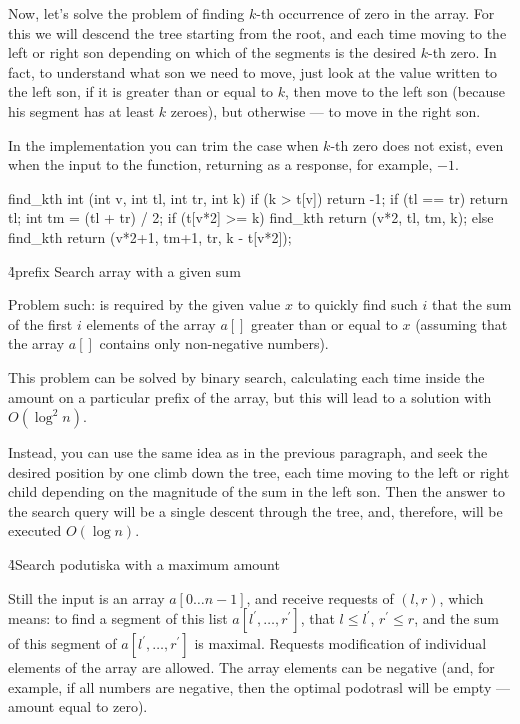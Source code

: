 Now, let's solve the problem of finding $k$-th occurrence of zero in the array. For this we will descend the tree starting from the root, and each time moving to the left or right son depending on which of the segments is the desired $k$-th zero. In fact, to understand what son we need to move, just look at the value written to the left son, if it is greater than or equal to $k$, then move to the left son (because his segment has at least $k$ zeroes), but otherwise --- to move in the right son.

In the implementation you can trim the case when $k$-th zero does not exist, even when the input to the function, returning as a response, for example, $-1$.

\code
find_kth int (int v, int tl, int tr, int k) {
if (k > t[v])
return -1;
if (tl == tr)
return tl;
int tm = (tl + tr) / 2;
if (t[v*2] >= k)
find_kth return (v*2, tl, tm, k);
else
find_kth return (v*2+1, tm+1, tr, k - t[v*2]);
}
\endcode

\h4{prefix Search array with a given sum}

Problem such: is required by the given value $x$ to quickly find such $i$ that the sum of the first $i$ elements of the array $a[]$ greater than or equal to $x$ (assuming that the array $a[]$ contains only non-negative numbers).

This problem can be solved by binary search, calculating each time inside the amount on a particular prefix of the array, but this will lead to a solution with $O (\log^2 n)$.

Instead, you can use the same idea as in the previous paragraph, and seek the desired position by one climb down the tree, each time moving to the left or right child depending on the magnitude of the sum in the left son. Then the answer to the search query will be a single descent through the tree, and, therefore, will be executed $O (\log n)$.

\h4{Search podutiska with a maximum amount}

Still the input is an array $a[0 \ldots n-1]$, and receive requests of $(l,r)$, which means: to find a segment of this list $a[l^\prime, \ldots, r^\prime]$, that $l \le l^\prime$, $r^\prime \le r$, and the sum of this segment of $a[l^\prime, \ldots, r^\prime]$ is maximal. Requests modification of individual elements of the array are allowed. The array elements can be negative (and, for example, if all numbers are negative, then the optimal podotrasl will be empty --- amount equal to zero).

